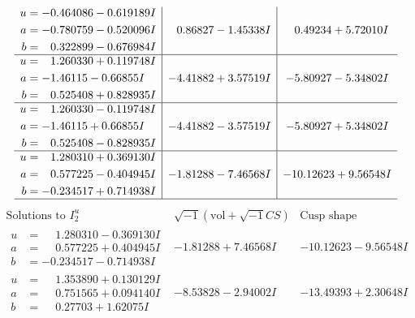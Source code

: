 \documentclass[1p]{elsarticle_modified}
\theoremstyle{definition}
\newcommand{\I}{\sqrt{-1}}
\begin{document}
$$\begin{array}{c|c|c}
\begin{aligned}
u &= -0.464086 - 0.619189 I \\
a &= -0.780759 - 0.520096 I \\
b &= \phantom{-}0.322899 - 0.676984 I\end{aligned}
 & \phantom{-}0.86827 - 1.45338 I & \phantom{-}0.49234 + 5.72010 I \\ \hline\begin{aligned}
u &= \phantom{-}1.260330 + 0.119748 I \\
a &= -1.46115 - 0.66855 I \\
b &= \phantom{-}0.525408 + 0.828935 I\end{aligned}
 & -4.41882 + 3.57519 I & -5.80927 - 5.34802 I \\ \hline\begin{aligned}
u &= \phantom{-}1.260330 - 0.119748 I \\
a &= -1.46115 + 0.66855 I \\
b &= \phantom{-}0.525408 - 0.828935 I\end{aligned}
 & -4.41882 - 3.57519 I & -5.80927 + 5.34802 I \\ \hline\begin{aligned}
u &= \phantom{-}1.280310 + 0.369130 I \\
a &= \phantom{-}0.577225 - 0.404945 I \\
b &= -0.234517 + 0.714938 I\end{aligned}
 & -1.81288 - 7.46568 I & -10.12623 + 9.56548 I\\
 \hline 
 \end{array}$$\newpage$$\begin{array}{c|c|c}  
\text{Solutions to }I^u_{2}& \I (\text{vol} + \sqrt{-1}CS) & \text{Cusp shape}\\
 \hline 
\begin{aligned}
u &= \phantom{-}1.280310 - 0.369130 I \\
a &= \phantom{-}0.577225 + 0.404945 I \\
b &= -0.234517 - 0.714938 I\end{aligned}
 & -1.81288 + 7.46568 I & -10.12623 - 9.56548 I \\ \hline\begin{aligned}
u &= \phantom{-}1.353890 + 0.130129 I \\
a &= \phantom{-}0.751565 + 0.094140 I \\
b &= \phantom{-}0.27703 + 1.62075 I\end{aligned}
 & -8.53828 - 2.94002 I & -13.49393 + 2.30648 I \\ \hline\begin{aligned}

\end{aligned}
\end{array}$$
\end{document}

